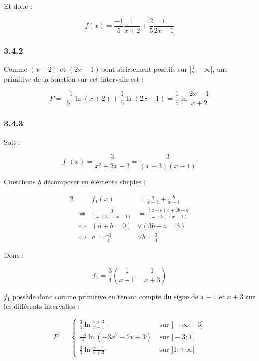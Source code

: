 \documentclass[a4paper,10pt]{report}
\begin{document}
Et donc :

\begin{displaymath}
	f(x) = \frac{-1}{5}\frac{1}{x+2} +  \frac{2}{5}\frac{1}{2x-1}
\end{displaymath}

\subsubsection*{3.4.2}

Comme $(x+2)$ et $(2x-1)$ sont strictement positifs sur $]\frac{1}{2};+\infty[$, une primitive de la fonction sur cet
intervalle est :

\begin{displaymath}
	P = \frac{-1}{5}\ln(x+2)+  \frac{1}{5}\ln(2x-1) = \frac{1}{5}\ln \frac{2x-1}{x+2}
\end{displaymath}

\subsubsection*{3.4.3}

Soit :

\begin{equation*}
	f_1(x) =\frac{3}{x^2 + 2x -3} = \frac{3}{(x+3)(x-1)}
\end{equation*}

Cherchons à décomposer en éléments simples :

\begin{alignat*}{2}
	&                     &                f_1(x) &= \frac{a}{x+3} +  \frac{b}{x-1}\\
	& \Longleftrightarrow & \frac{3}{(x+3)(x-1)}  &=  \frac{(a+b)x + 3b -a}{(x+3)(x-1)} \\
	& \Longleftrightarrow & (a+b=0)               &\vee (3b-a = 3) \\
	& \Longleftrightarrow & a=\frac{-3}{4}        &\vee b = \frac{3}{4}
\end{alignat*}

Donc :

\begin{displaymath}
	f_1 = \frac{3}{4} \left( \frac{1}{x-1} - \frac{1}{x+3} \right)
\end{displaymath}

$f_1$ possède donc comme primitive en tenant compte du signe de $x-1$ et $x+3$ sur les différents intervalles :

\begin{displaymath}
	P_1 = 
	\begin{cases}
		\frac{3}{4} \ln \frac{x+3}{x-1}      & \text{ sur } ]-\infty ; -3]\\
		\frac{-3}{4} \ln(-3x^2-2x+3)         & \text{ sur } ]-3 ; 1[\\
		\frac{3}{4} \ln \frac{x-1}{x+3}      & \text{ sur } ]1 ; +\infty[
	\end{cases}
\end{displaymath}
\end{document}
